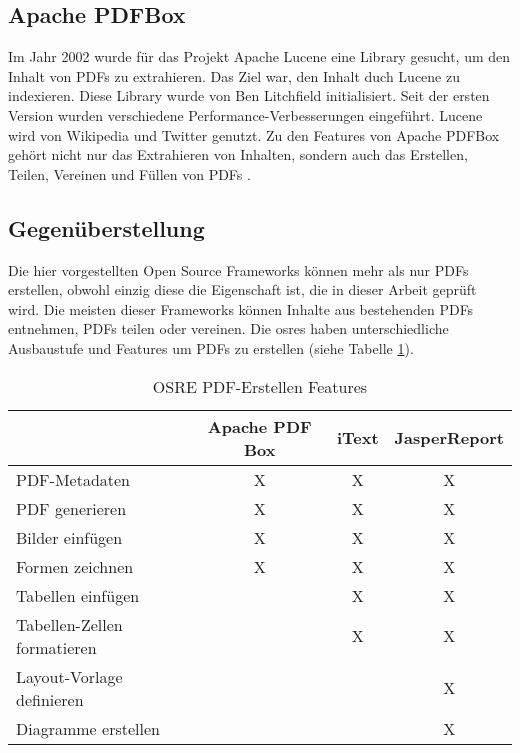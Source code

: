 \documentclass[main.tex]{subfiles}
\begin{document}
\subsection{Apache PDFBox}
Im Jahr 2002 wurde für das Projekt Apache Lucene eine Library gesucht, um den Inhalt von PDFs zu extrahieren. Das Ziel war, den Inhalt duch Lucene zu indexieren. Diese Library wurde von Ben Litchfield initialisiert. Seit der ersten Version wurden verschiedene Performance-Verbesserungen eingeführt. Lucene wird von Wikipedia und Twitter genutzt. Zu den Features von Apache PDFBox gehört nicht nur das Extrahieren von Inhalten, sondern auch das Erstellen, Teilen, Vereinen und Füllen von PDFs \cite{apachepdfbox_history}.


\subsection{Gegenüberstellung}

Die hier vorgestellten Open Source Frameworks können mehr als nur PDFs erstellen, obwohl einzig diese die Eigenschaft ist, die in dieser Arbeit geprüft wird. Die meisten dieser Frameworks können Inhalte aus bestehenden PDFs entnehmen, PDFs teilen oder vereinen. 
Die \acrshort{osre}s haben unterschiedliche Ausbaustufe und Features um PDFs zu erstellen (siehe Tabelle \ref{table:featuresOSRE}). 


\begin{table}[h]
\centering

\begin{tabular}{lccc}
                                & Apache PDF Box & iText  & JasperReport \\ \hline
PDF-Metadaten                   &       X      &   X    &     X        \\
PDF generieren                  &       X      &   X    &     X        \\
Bilder einfügen                 &       X      &   X    &     X        \\
Formen zeichnen                 &       X      &   X    &     X        \\
Tabellen einfügen               &              &   X    &     X        \\
Tabellen-Zellen formatieren     &              &   X    &     X        \\
Layout-Vorlage definieren       &              &        &     X        \\
Diagramme erstellen             &              &        &     X        \\
\end{tabular}
\caption{OSRE PDF-Erstellen Features}
\label{table:featuresOSRE}
\end{table}
\end{document}
